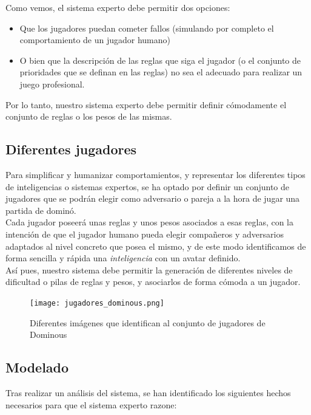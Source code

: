 Como vemos, el sistema experto debe permitir dos opciones:
\begin{itemize}
    \item Que los jugadores puedan cometer fallos (simulando por completo el comportamiento de un jugador humano)
    \item O bien que la descripción de las reglas que siga el jugador (o el conjunto de prioridades que se definan
            en las reglas) no sea el adecuado para realizar un juego profesional.
\end{itemize}

Por lo tanto, nuestro sistema experto debe permitir definir cómodamente el conjunto de reglas o los pesos de las mismas.

\subsection{Diferentes jugadores}

Para simplificar y humanizar comportamientos, y representar los diferentes tipos de inteligencias o sistemas expertos,
se ha optado por definir un conjunto de jugadores que se podrán elegir como adversario o pareja a la hora de jugar
una partida de dominó. \\

Cada jugador poseerá unas reglas y unos pesos asociados a esas reglas, con la intención de que el jugador humano pueda
elegir compañeros y adversarios adaptados al nivel concreto que posea el mismo, y de este modo identificamos de forma
sencilla y rápida una \emph{inteligencia} con un avatar definido. \\

Así pues, nuestro sistema debe permitir la generación de diferentes niveles de dificultad o pilas de reglas y pesos,
y asociarlos de forma cómoda a un jugador.

\begin{figure}[h]
  \begin{center}
    \texttt{[image: jugadores\_dominous.png]}
  \end{center}
  \caption{Diferentes imágenes que identifican al conjunto de jugadores de Dominous}
  \label{fig:jugadores_dominous}
\end{figure}

\subsection{Modelado}

Tras realizar un análisis del sistema, se han identificado los siguientes hechos necesarios para que el sistema experto razone:

